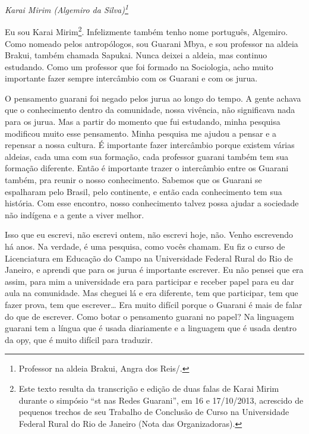 \begin{flushright}
\emph{Karai Mirim (Algemiro da Silva)\footnote{Professor na aldeia Brakui,
Angra dos Reis/.}}
\end{flushright} 

Eu sou Karai Mirim\footnote{Este texto resulta da transcrição e edição
de duas falas de Karai Mirim durante o simpósio ``st nas Redes
Guarani'', em 16 e 17/10/2013, acrescido de pequenos trechos de seu
Trabalho de Conclusão de Curso na Universidade Federal Rural do Rio de
Janeiro (Nota das Organizadoras).}. Infelizmente também tenho nome
português, Algemiro. Como nomeado pelos antropólogos, sou Guarani Mbya,
e sou professor na aldeia Brakui, também chamada Sapukai. Nunca deixei
a aldeia, mas continuo estudando. Como um professor que foi formado na
Sociologia, acho muito importante fazer sempre intercâmbio com os
Guarani e com os jurua.

O pensamento guarani foi negado pelos jurua ao longo do tempo. A gente
achava que o conhecimento dentro da comunidade, nossa vivência, não
significava nada para os jurua. Mas a partir do momento que fui
estudando, minha pesquisa modificou muito esse pensamento. Minha
pesquisa me ajudou a pensar e a repensar a nossa cultura. É importante
fazer intercâmbio porque existem várias aldeias, cada uma com sua
formação, cada professor guarani também tem sua formação diferente.
Então é importante trazer o intercâmbio entre os Guarani também, pra
reunir o nosso conhecimento. Sabemos que os Guarani se espalharam pelo
Brasil, pelo continente, e então cada conhecimento tem sua história.
Com esse encontro, nosso conhecimento talvez possa ajudar a sociedade
não indígena e a gente a viver melhor.

Isso que eu escrevi, não escrevi ontem, não escrevi hoje, não. Venho
escrevendo há anos. Na verdade, é uma pesquisa, como vocês chamam. Eu
fiz o curso de Licenciatura em Educação do Campo na Universidade
Federal Rural do Rio de Janeiro, e aprendi que para os jurua é
importante escrever. Eu não pensei que era assim, para mim a
universidade era para participar e receber papel para eu dar aula na
comunidade. Mas cheguei lá e era diferente, tem que participar, tem que
fazer prova, tem que escrever\ldots{} Era muito difícil porque o Guarani é
mais de falar do que de escrever. Como botar o pensamento guarani no
papel? Na linguagem guarani tem a língua que é usada diariamente e a
linguagem que é usada dentro da opy, que é muito difícil para traduzir.

